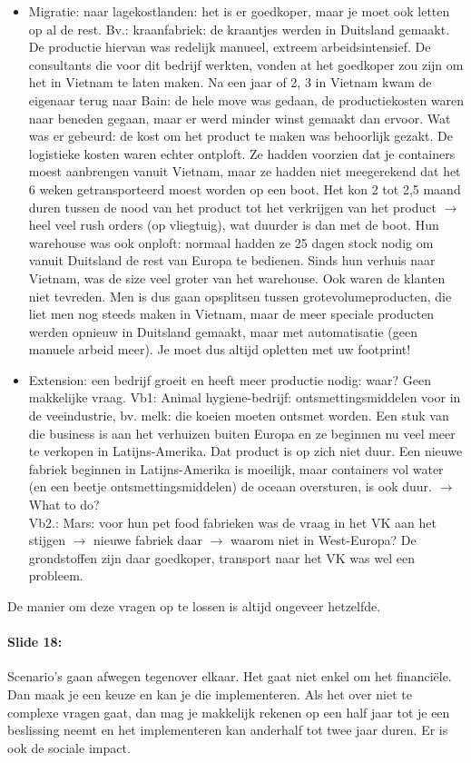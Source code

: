 \documentclass[10pt,a4paper]{report}
\begin{document}
\begin{itemize}
\item Migratie: naar lagekostlanden: het is er goedkoper, maar je moet ook letten op al de rest. Bv.: kraanfabriek: de kraantjes werden in Duitsland gemaakt. De productie hiervan was redelijk manueel, extreem arbeidsintensief. De consultants die voor dit bedrijf werkten, vonden at het goedkoper zou zijn om het in Vietnam te laten maken. Na een jaar of 2, 3 in Vietnam kwam de eigenaar terug naar Bain: de hele move was gedaan, de productiekosten waren naar beneden gegaan, maar er werd minder winst gemaakt dan ervoor. Wat was er gebeurd: de kost om het product te maken was behoorlijk gezakt. De logistieke kosten waren echter ontploft. Ze hadden voorzien dat je containers moest aanbrengen vanuit Vietnam, maar ze hadden niet meegerekend dat het 6 weken getransporteerd moest worden op een boot. Het kon 2 tot 2,5 maand duren tussen de nood van het product tot het verkrijgen van het product $\rightarrow$ heel veel rush orders (op vliegtuig), wat duurder is dan met de boot. Hun warehouse was ook onploft: normaal hadden ze 25 dagen stock nodig om vanuit Duitsland de rest van Europa te bedienen. Sinds hun verhuis naar Vietnam, was de size veel groter van het warehouse. Ook waren de klanten niet tevreden. Men is dus gaan opsplitsen tussen grotevolumeproducten, die liet men nog steeds maken in Vietnam, maar de meer speciale producten werden opnieuw in Duitsland gemaakt, maar met automatisatie (geen manuele arbeid meer). Je moet dus altijd opletten met uw footprint!
\item Extension: een bedrijf groeit en heeft meer productie nodig: waar? Geen makkelijke vraag. Vb1: Animal hygiene-bedrijf: ontsmettingsmiddelen voor in de veeindustrie, bv. melk: die koeien moeten ontsmet worden. Een stuk van die business is aan het verhuizen buiten Europa en ze beginnen nu veel meer te verkopen in Latijns-Amerika. Dat product is op zich niet duur. Een nieuwe fabriek beginnen in Latijns-Amerika is moeilijk, maar containers vol water (en een beetje ontsmettingsmiddelen) de oceaan oversturen, is ook duur. $\rightarrow$ What to do? \\
Vb2.: Mars: voor hun pet food fabrieken was de vraag in het VK aan het stijgen $\rightarrow$ nieuwe fabriek daar $\rightarrow$ waarom niet in West-Europa? De grondstoffen zijn daar goedkoper, transport naar het VK was wel een probleem. 
\end{itemize}
De manier om deze vragen op te lossen is altijd ongeveer hetzelfde. 

\paragraph{Slide 18:} Scenario's gaan afwegen tegenover elkaar. Het gaat niet enkel om het financi\"ele. Dan maak je een keuze en kan je die implementeren. Als het over niet te complexe vragen gaat, dan mag je makkelijk rekenen op een half jaar tot je een beslissing neemt en het implementeren kan anderhalf tot twee jaar duren. Er is ook de sociale impact. 
\end{document}
